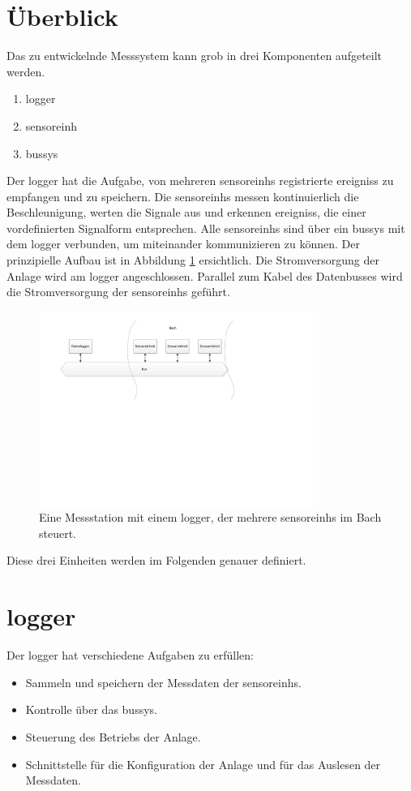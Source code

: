 \section{Überblick}\label{sec.ueberblick}
Das zu entwickelnde Messsystem kann grob in drei Komponenten aufgeteilt werden. 
\begin{enumerate}
\item \gls{logger}
\item \gls{sensoreinh}
\item \gls{bussys}
\end{enumerate}
Der \gls{logger} hat die Aufgabe, von mehreren \glspl{sensoreinh} registrierte \glspl{ereignis} zu empfangen und zu speichern. Die \glspl{sensoreinh} messen kontinuierlich die Beschleunigung, werten die Signale aus und erkennen \glspl{ereignis}, die einer vordefinierten Signalform entsprechen. Alle \glspl{sensoreinh} sind über ein \gls{bussys} mit dem \gls{logger} verbunden, um miteinander kommunizieren zu können. Der prinzipielle Aufbau ist in Abbildung \ref{fig.situationskroki} ersichtlich. Die Stromversorgung der Anlage wird am \gls{logger} angeschlossen. Parallel zum Kabel des Datenbusses wird die Stromversorgung der \glspl{sensoreinh} geführt.

\begin{figure}[H]
	\centering
		\includegraphics[width=0.8\textwidth]{images/visio/Situationskroki.pdf}
	\caption{Eine Messstation mit einem \gls{logger}, der mehrere \glspl{sensoreinh} im Bach steuert.}
	\label{fig.situationskroki}
\end{figure}

Diese drei Einheiten werden im Folgenden genauer definiert.

\section{\gls{logger}}
Der \gls{logger} hat verschiedene Aufgaben zu erfüllen:
\begin{itemize}
\item Sammeln und speichern der Messdaten der \glspl{sensoreinh}.
\item Kontrolle über das \gls{bussys}.
\item Steuerung des Betriebs der Anlage.
\item Schnittstelle für die Konfiguration der Anlage und für das Auslesen der Messdaten.
\end{itemize}


